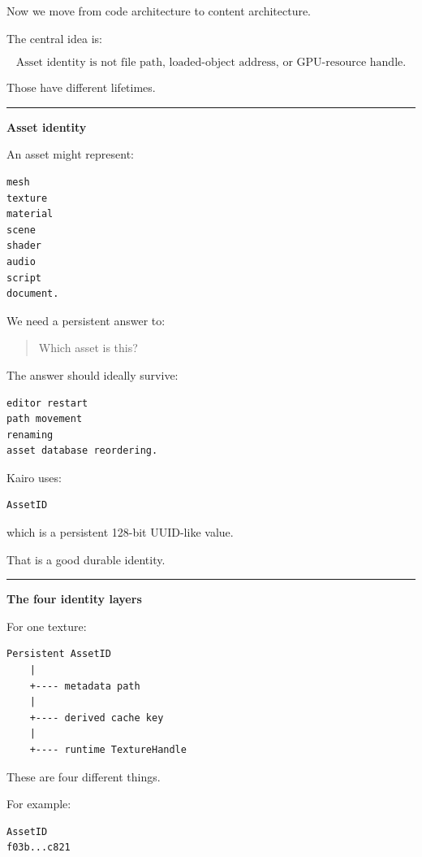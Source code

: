 Now we move from code architecture to content architecture.

The central idea is:

\[
\boxed{
\text{Asset identity is not file path,
loaded-object address,
or GPU-resource handle.}
}
\]

Those have different lifetimes.

\begin{center}\rule{0.5\linewidth}{0.5pt}\end{center}

\textbf{Asset identity}

An asset might represent:

\begin{verbatim}
mesh
texture
material
scene
shader
audio
script
document.
\end{verbatim}

We need a persistent answer to:

\begin{quote}
Which asset is this?
\end{quote}

The answer should ideally survive:

\begin{verbatim}
editor restart
path movement
renaming
asset database reordering.
\end{verbatim}

Kairo uses:

\begin{verbatim}
AssetID
\end{verbatim}

which is a persistent 128-bit UUID-like value.

That is a good durable identity.

\begin{center}\rule{0.5\linewidth}{0.5pt}\end{center}

\textbf{The four identity layers}

For one texture:

\begin{verbatim}
Persistent AssetID
    |
    +---- metadata path
    |
    +---- derived cache key
    |
    +---- runtime TextureHandle
\end{verbatim}

These are four different things.

For example:

\begin{verbatim}
AssetID
f03b...c821
\end{verbatim}

